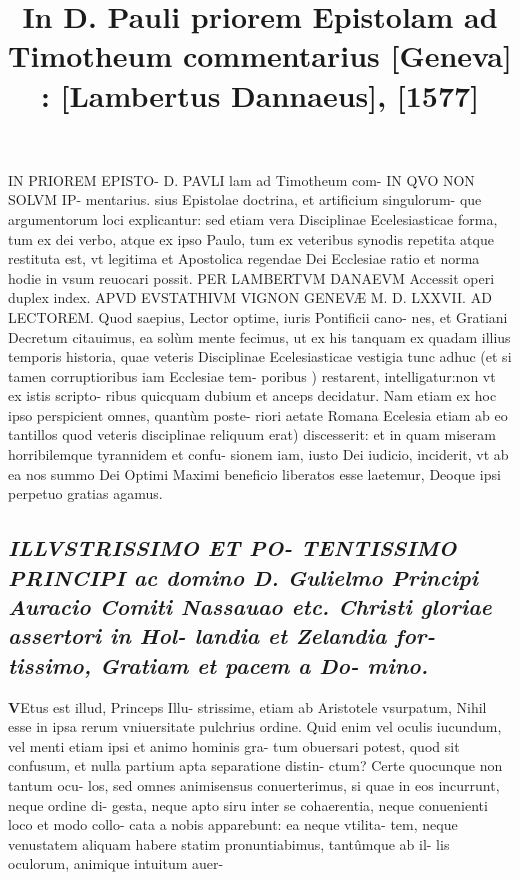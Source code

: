 \documentclass{article}
\begin{document}
\date{}
        \title{In D. Pauli priorem Epistolam ad Timotheum commentarius [Geneva] : [Lambertus Dannaeus], [1577]}
\maketitle
\tableofcontents
\clearpage
\begin{pages} 
\beginnumbering
        IN PRIOREM EPISTO- D.  PAVLI lam ad Timotheum com- IN QVO NON SOLVM IP- mentarius. sius Epistolae doctrina, et artificium singulorum- que argumentorum loci explicantur: sed etiam vera Disciplinae Ecelesiasticae forma, tum ex dei verbo, atque ex ipso Paulo, tum ex veteribus synodis repetita atque restituta est, vt legitima et Apostolica regendae Dei Ecclesiae ratio et norma hodie in vsum reuocari possit. PER LAMBERTVM DANAEVM Accessit operi duplex index. APVD EVSTATHIVM VIGNON GENEVÆ M. D. LXXVII. \pstart AD LECTOREM. Quod saepius, Lector optime, iuris Pontificii cano- nes, et Gratiani Decretum citauimus, ea solùm mente fecimus, ut ex his tanquam ex quadam illius temporis historia, quae veteris Disciplinae Ecelesiasticae vestigia tunc adhuc (et si tamen corruptioribus iam Ecclesiae tem- poribus ) restarent, intelligatur:non vt ex istis scripto- ribus quicquam dubium et anceps decidatur. Nam etiam ex hoc ipso perspicient omnes, quantùm poste- riori aetate Romana Ecelesia etiam ab eo tantillos quod veteris disciplinae reliquum erat) discesserit: et in quam miseram horribilemque tyrannidem et confu- sionem iam, iusto Dei iudicio, inciderit, vt ab ea nos summo Dei Optimi Maximi beneficio liberatos esse laetemur, Deoque ipsi perpetuo gratias agamus.  \pend
{}
{}
\subsection*{\textit{ILLVSTRISSIMO ET PO- TENTISSIMO PRINCIPI ac domino D. Gulielmo Principi Auracio Comiti Nassauao etc.  Christi gloriae assertori in Hol- landia et Zelandia for- tissimo, Gratiam et pacem a Do- mino. }}\pstart \huge\textbf{V}\normalsize Etus est illud, Princeps Illu- strissime, etiam ab Aristotele vsurpatum, Nihil esse in ipsa rerum vniuersitate pulchrius ordine. Quid enim vel oculis iucundum, vel menti etiam ipsi et animo hominis gra- tum obuersari potest, quod sit confusum, et nulla partium apta separatione distin- ctum? Certe quocunque non tantum ocu- los, sed omnes animisensus conuerterimus, si quae in eos incurrunt, neque ordine di- gesta, neque apto siru inter se cohaerentia, neque conuenienti loco et modo collo- cata a nobis apparebunt: ea neque vtilita- tem, neque venustatem aliquam habere statim pronuntiabimus, tantûmque ab il- lis oculorum, animique intuitum auer-  \pend

\end{pages}
\end{document}
